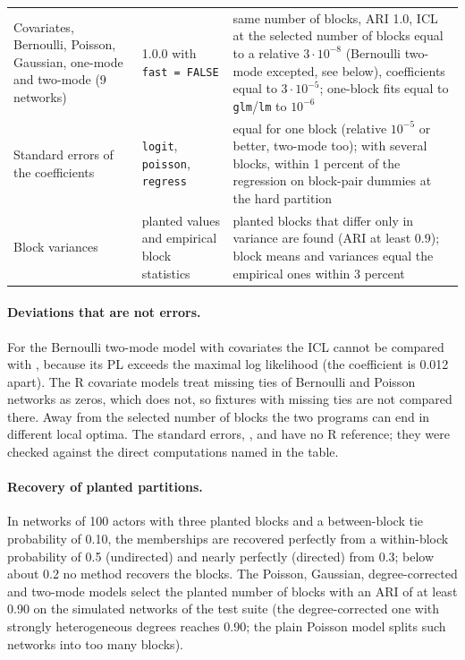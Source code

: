 \begin{center}
\begin{tabular}{p{}p{}p{}}
Covariates, Bernoulli, Poisson, Gaussian, one-mode and two-mode (9 networks) & \sbmR{} 1.0.0 with \texttt{fast = FALSE} & same number of blocks, ARI 1.0, ICL at the selected number of blocks equal to a relative $3\cdot10^{-8}$ (Bernoulli two-mode excepted, see below), coefficients equal to $3\cdot10^{-5}$; one-block fits equal to \texttt{glm}/\texttt{lm} to $10^{-6}$\\
Standard errors of the coefficients & \texttt{logit}, \texttt{poisson}, \texttt{regress} & equal for one block (relative $10^{-5}$ or better, two-mode too); with several blocks, within 1 percent of the regression on block-pair dummies at the hard partition\\
Block variances & planted values and empirical block statistics & planted blocks that differ only in variance are found (ARI at least 0.9); block means and variances equal the empirical ones within 3 percent\\
\bottomrule
\end{tabular}
\end{center}

\paragraph{Deviations that are not errors.} For the Bernoulli two-mode model with covariates the ICL cannot be compared with \blockmodels{}, because its PL exceeds the maximal log likelihood (the coefficient is 0.012 apart). The R covariate models treat missing ties of Bernoulli and Poisson networks as zeros, which \nwsbm{} does not, so fixtures with missing ties are not compared there. Away from the selected number of blocks the two programs can end in different local optima. The standard errors, ,  and  have no R reference; they were checked against the direct computations named in the table.

\paragraph{Recovery of planted partitions.} In networks of 100 actors with three planted blocks and a between-block tie probability of 0.10, the memberships are recovered perfectly from a within-block probability of 0.5 (undirected) and nearly perfectly (directed) from 0.3; below about 0.2 no method recovers the blocks. The Poisson, Gaussian, degree-corrected and two-mode models select the planted number of blocks with an ARI of at least 0.90 on the simulated networks of the test suite (the degree-corrected one with strongly heterogeneous degrees reaches 0.90; the plain Poisson model splits such networks into too many blocks).
